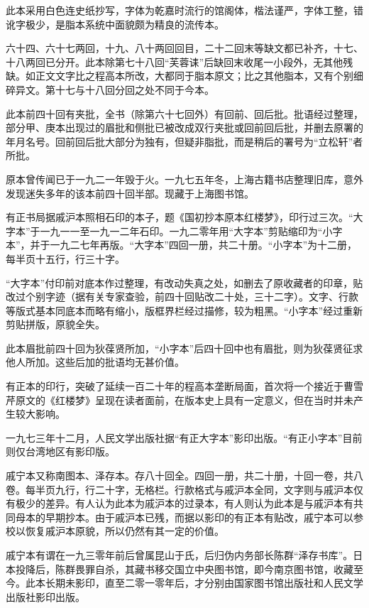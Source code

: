 此本采用白色连史纸抄写，字体为乾嘉时流行的馆阁体，楷法谨严，字体工整，错讹字极少，是脂本系统中面貌颇为精良的流传本。

六十四、六十七两回，十九、八十两回回目，二十二回末等缺文都已补齐，十七、十八两回已分开。此本除第七十八回“芙蓉诔”后缺回末收尾一小段外，无其他残缺。如正文文字比之程高本所改，大都同于脂本原文；比之其他脂本，又有个别细碎异文。第十七与十八回分回之处不同于今本。

此本前四十回有夹批，全书（除第六十七回外）有回前、回后批。批语经过整理，部分甲、庚本出现过的眉批和侧批已被改成双行夹批或回前回后批，并删去原署的年月名号。回前回后批大部分为独有，但疑非脂批，而是稍后的署号为“立松轩”者所批。

原本曾传闻已于一九二一年毁于火。一九七五年冬，上海古籍书店整理旧库，意外发现迷失多年的该本前四十回半部。现藏于上海图书馆。

有正书局据戚沪本照相石印的本子，题《国初抄本原本红楼梦》，印行过三次。“大字本”于一九一一至一九一二年石印。一九二零年用“大字本”剪贴缩印为“小字本”，并于一九二七年再版。“大字本”四回一册，共二十册。“小字本”为十二册，每半页十五行，行三十字。

“大字本”付印前对底本作过整理，有改动失真之处，如删去了原收藏者的印章，贴改过个别字迹（据有关专家查验，前四十回贴改二十处，三十二字）。文字、行款等版式基本同底本而略有缩小，版框界栏经过描修，较为粗黑。“小字本”经过重新剪贴拼版，原貌全失。

此本眉批前四十回为狄葆贤所加，“小字本”后四十回中也有眉批，则为狄葆贤征求他人所加。这些后加的批语均无甚价值。

有正本的印行，突破了延续一百二十年的程高本垄断局面，首次将一个接近于曹雪芹原文的《红楼梦》呈现在读者面前，在版本史上具有一定意义，但在当时并未产生较大影响。

一九七三年十二月，人民文学出版社据“有正大字本”影印出版。“有正小字本”目前则仅台湾地区有影印版。

戚宁本又称南图本、泽存本。存八十回全。四回一册，共二十册，十回一卷，共八卷。每半页九行，行二十字，无格栏。行款格式与戚沪本全同，文字则与戚沪本仅有极少的差异。有人认为此本为戚沪本的过录本，有人则认为此本是与戚沪本有共同母本的早期抄本。由于戚沪本已残，而据以影印的有正本有贴改，戚宁本可以参校以恢复戚沪本原貌，所以仍然有其一定的价值。

戚宁本有谓在一九三零年前后曾属昆山于氏，后归伪内务部长陈群“泽存书库”。日本投降后，陈群畏罪自杀，其藏书移交国立中央图书馆，即今南京图书馆，收藏至今。此本长期未影印，直至二零一零年后，才分别由国家图书馆出版社和人民文学出版社影印出版。

{ }

